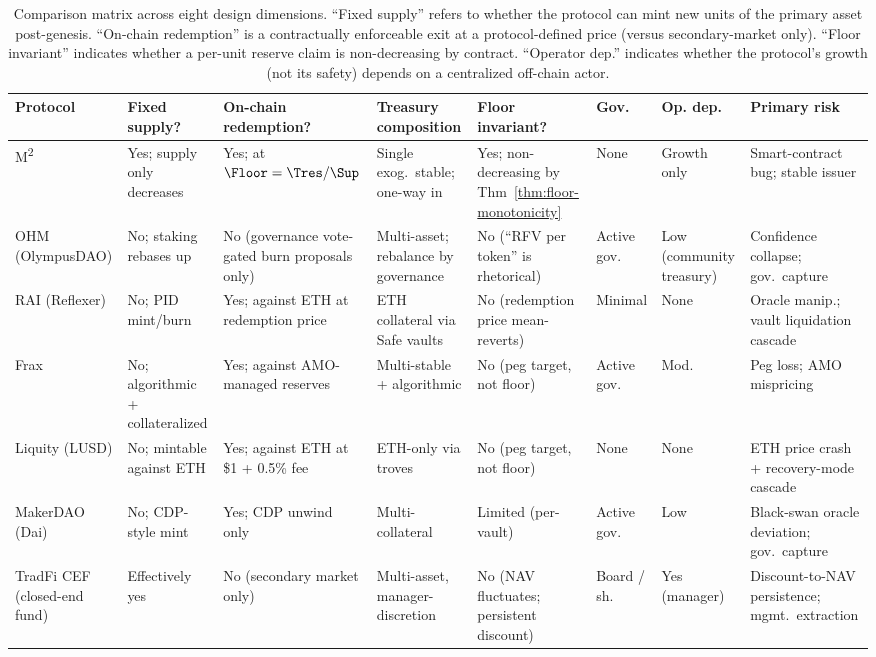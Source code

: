 \begin{table}[t]
\centering
\scriptsize
\caption{Comparison matrix across eight design dimensions. ``Fixed supply'' refers to whether the protocol can mint new units of the primary asset post-genesis. ``On-chain redemption'' is a contractually enforceable exit at a protocol-defined price (versus secondary-market only). ``Floor invariant'' indicates whether a per-unit reserve claim is non-decreasing by contract. ``Operator dep.'' indicates whether the protocol's growth (not its safety) depends on a centralized off-chain actor.}
\label{tab:protocol-comparison}
\renewcommand{\arraystretch}{1.18}
\begin{tabular}{p{1.5cm} p{1.25cm} p{1.55cm} p{1.4cm} p{1.5cm} p{1.4cm} p{1.0cm} p{1.85cm}}
\toprule
\textbf{Protocol} & \textbf{Fixed supply?} & \textbf{On-chain redemption?} & \textbf{Treasury composition} & \textbf{Floor invariant?} & \textbf{Gov.} & \textbf{Op. dep.} & \textbf{Primary risk} \\
\midrule
M\textsuperscript{2} & Yes; supply only decreases & Yes; at $\Floor = \Tres/\Sup$ & Single exog.\ stable; one-way in & Yes; non-decreasing by Thm~\ref{thm:floor-monotonicity} & None & Growth only & Smart-contract bug; stable issuer \\
OHM (OlympusDAO) & No; staking rebases up & No (governance vote-gated burn proposals only) & Multi-asset; rebalance by governance & No (``RFV per token'' is rhetorical) & Active gov. & Low (community treasury) & Confidence collapse; gov.\ capture \\
RAI (Reflexer) & No; PID mint/burn & Yes; against ETH at redemption price & ETH collateral via Safe vaults & No (redemption price mean-reverts) & Minimal & None & Oracle manip.; vault liquidation cascade \\
Frax & No; algorithmic + collateralized & Yes; against AMO-managed reserves & Multi-stable + algorithmic & No (peg target, not floor) & Active gov. & Mod. & Peg loss; AMO mispricing \\
Liquity (LUSD) & No; mintable against ETH & Yes; against ETH at \$1 + 0.5\% fee & ETH-only via troves & No (peg target, not floor) & None & None & ETH price crash + recovery-mode cascade \\
MakerDAO (Dai) & No; CDP-style mint & Yes; CDP unwind only & Multi-collateral & Limited (per-vault) & Active gov. & Low & Black-swan oracle deviation; gov.\ capture \\
\midrule
TradFi CEF (closed-end fund) & Effectively yes & No (secondary market only) & Multi-asset, manager-discretion & No (NAV fluctuates; persistent discount) & Board / sh. & Yes (manager) & Discount-to-NAV persistence; mgmt.\ extraction \\
\bottomrule
\end{tabular}
\end{table}

